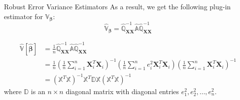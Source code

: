 \documentclass[12pt, block=fill]{beamer}
\renewcommand{\v}[1]{\pmb{#1}}
\newcommand{\m}[1]{\mathbb{#1}}
\begin{document}
\begin{frame}{Robust Error Variance Estimators}
As a result, we get the following plug-in estimator for $\m{V}_{\v{\beta}}$:
$$
\widehat{\m{V}}_{\v{\beta}}=
\widehat{\m{Q}}_{\v{XX}}^{-1}\widehat{\m{A}}\widehat{\m{Q}}_{\v{XX}}^{-1}
$$

$$
\begin{aligned}
\widehat{\m{V}}\left[\widehat{\v{\beta}}\right]
&=\frac{1}{n}\widehat{\m{Q}}_{\v{XX}}^{-1}\widehat{\m{A}}\widehat{\m{Q}}_{\v{XX}}^{-1} \\
&=\frac{1}{n}\left(\frac{1}{n}\sum\limits_{i=1}^n\v{X}_i^T\v{X}_i\right)^{-1}
\left(\frac{1}{n}\sum\limits_{i=1}^ne_i^2\v{X}_i^T\v{X}_i\right)
\left(\frac{1}{n}\sum\limits_{i=1}^n\v{X}_i^T\v{X}_i\right)^{-1} \\
&=\left(\m{X}^T\m{X}\right)^{-1}
\m{X}^T\m{D}\m{X}
\left(\m{X}^T\m{X}\right)^{-1}
\end{aligned}
$$
where $\m{D}$ is an $n\times n$ diagonal matrix with diagonal entries $e_1^2,e_2^2,\ldots,e_n^2$.
\end{frame}
\end{document}
